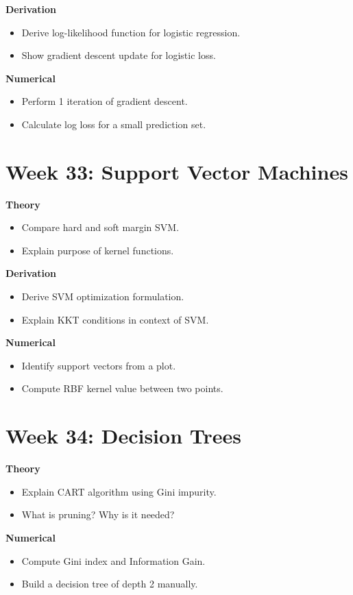 \documentclass[12pt]{article}
\begin{document}
\textbf{Derivation}
\begin{itemize}
\item Derive log-likelihood function for logistic regression.
\item Show gradient descent update for logistic loss.
\end{itemize}

\textbf{Numerical}
\begin{itemize}
\item Perform 1 iteration of gradient descent.
\item Calculate log loss for a small prediction set.
\end{itemize}

\section*{Week 33: Support Vector Machines}
\textbf{Theory}
\begin{itemize}
\item Compare hard and soft margin SVM.
\item Explain purpose of kernel functions.
\end{itemize}

\textbf{Derivation}
\begin{itemize}
\item Derive SVM optimization formulation.
\item Explain KKT conditions in context of SVM.
\end{itemize}

\textbf{Numerical}
\begin{itemize}
\item Identify support vectors from a plot.
\item Compute RBF kernel value between two points.
\end{itemize}

\section*{Week 34: Decision Trees}
\textbf{Theory}
\begin{itemize}
\item Explain CART algorithm using Gini impurity.
\item What is pruning? Why is it needed?
\end{itemize}

\textbf{Numerical}
\begin{itemize}
\item Compute Gini index and Information Gain.
\item Build a decision tree of depth 2 manually.
\end{itemize}
\end{document}
